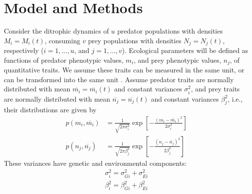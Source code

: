 \documentclass{amsart}
\theoremstyle{definition}
\theoremstyle{remark}
\numberwithin{equation}{section}
\begin{document}

































\section{Model and Methods}

Consider the ditrophic dynamics of $u$ predator populations with densities $M_i = M_i(t)$, consuming $v$ prey populations with densities $N_j = N_j(t)$, respectively ($i = 1, \dots, u$, and $j = 1, \dots, v$).  Ecological parameters will be defined as functions of predator phenotypic values, $m_i$, and prey phenotypic values, $n_j$, of quantitative traits.  We assume these traits can be measured in the same unit, or can be transformed into the same unit \cite{Saloniemi_1993}.  Assume predator traits are normally distributed with mean $\overline{m_i} = \overline{m_i}(t)$ and constant variances $\sigma_i^2$, and prey traits are normally distributed with mean $\overline{n_j} = \overline{n_j}(t)$ and constant variances $\beta_j^2$, i.e., their distributions are given by
\begin{equation}
	\label{distributions}
	\begin{aligned}
		p(m_i, \overline{m_i}) &= \frac{1}{\sqrt{2\pi\sigma_i^2}}\exp\left[-\frac{(m_i - \overline{m_i})^2}{2\sigma_i^2}\right] \\
		p(n_j, \overline{n_j}) &= \frac{1}{\sqrt{2\pi\beta_j^2}}\exp\left[-\frac{(n_j - \overline{n_j})^2}{2\beta_j^2}\right]
	\end{aligned}
\end{equation}
These variances have genetic and environmental components:
\begin{equation}
	\label{variances}
	\begin{aligned}
		\sigma_i^2 = \sigma_{Gi}^2 + \sigma_{Ei}^2 \\
		\beta_i^2 = \beta_{Gi}^2 + \beta_{Ei}^2
	\end{aligned}
\end{equation}
\end{document}
